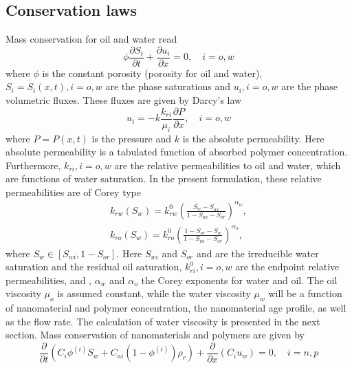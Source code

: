 \documentclass[energies,article,submit,moreauthors,pdftex]{Definitions/mdpi}
\begin{document}
\subsection{Conservation laws}
Mass conservation for oil and water read \cite{Dake1978}
\begin{equation} \label{eq:massConservation} %
    \phi\frac{\partial S_i}{\partial t}+\frac{\partial u_i}{\partial x} = 0,\quad i = o, w
\end{equation}
where $\phi$ is the constant porosity (porosity for oil and water), $S_i=S_i(x,t), i = o,w$ are the phase saturations and $u_i, i=o,w$ are the phase volumetric fluxes. These fluxes are given by Darcy’s law \cite{Dake1978}
\begin{equation} \label{eq:fluxes} %
    u_i= -k\frac{k_{ri}}{\mu_i}\frac{\partial P}{\partial x},\quad i = o, w
\end{equation}
where $P=P(x,t)$  is the pressure and $k$ is the absolute permeability. Here absolute permeability is a tabulated function of absorbed polymer concentration. Furthermore, $k_{ri}, i = o, w$ are the relative permeabilities to oil and water, which are functions of water saturation. In the present formulation, these relative permeabilities are of Corey type \cite{Brooks1964}
\begin{subequations}
\begin{eqnarray}
 k_{rw}(S_w)=k^0_{rw}(\frac{S_w-S_{wi}}{1-S_{wi}-S_{or}})^{\alpha_w} ,\\
    k_{ro}(S_w)=k^0_{ro}(\frac{1-S_{or}-S_{w}}{1-S_{wi}-S_{or}})^{\alpha_o} ,
\end{eqnarray}
\end{subequations}
where $S_w\in [S_{wi}, 1-S_{or}]$. Here $S_{wi}$ and $S_{or}$ and are the irreducible water saturation and the residual oil saturation, $k^0_{ri}, i=o,w$  are the endpoint relative permeabilities, and , $\alpha_w$ and $\alpha_o$  the Corey exponents for water and oil. The oil viscosity $\mu_o$ is assumed constant, while the water viscosity $\mu_w$ will be a function of nanomaterial and polymer concentration, the nanomaterial age profile, as well as the flow rate. The calculation of water viscosity is presented in the next section.
Mass conservation of nanomaterials and polymers are given by 
\begin{equation} \label{eq:massConsNPpol} %
    \frac{\partial}{\partial t}(C_i\phi^{(i)}S_w + C_{ai}(1-\phi^{(i)})\rho_r)+ \frac{\partial}{\partial x}(C_i u_w) = 0, \quad i = n, p
\end{equation}
\end{document}
